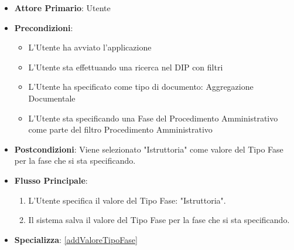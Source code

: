 \begin{itemize}
      \item \textbf{Attore Primario}: Utente
      \item \textbf{Precondizioni}: 
      \begin{itemize}
            \item L'Utente ha avviato l'applicazione
            \item L'Utente sta effettuando una ricerca nel DIP con filtri
            \item L'Utente ha specificato come tipo di documento: Aggregazione Documentale
            \item L'Utente sta specificando una Fase del Procedimento Amministrativo come parte del filtro Procedimento Amministrativo
      \end{itemize}
      \item \textbf{Postcondizioni}: Viene selezionato "Istruttoria" come valore del Tipo Fase per la fase che si sta specificando.
      \item \textbf{Flusso Principale}:
      \begin{enumerate}
            \item L'Utente specifica il valore del Tipo Fase: "Istruttoria".
            \item Il sistema salva il valore del Tipo Fase per la fase che si sta specificando.
      \end{enumerate}
      \item \textbf{Specializza}: \ref{addValoreTipoFase}
\end{itemize}

